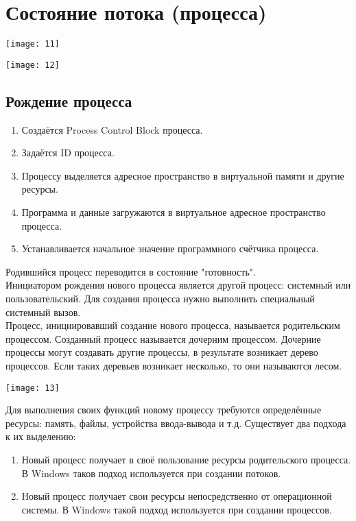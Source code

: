 \documentclass[a4paper]{article}
\begin{document}
\section{Состояние потока (процесса)}
\setcounter{subsection}{0}
\begin{center}
	\texttt{[image: 11]}
\end{center}
\begin{center}
	\texttt{[image: 12]}
\end{center}
\subsection{Рождение процесса}
\begin{enumerate}
        \item Создаётся Process Control Block процесса.
	\item Задаётся ID процесса.
	\item Процессу выделяется адресное пространство в виртуальной памяти и другие ресурсы.
	\item Программа и данные загружаются в виртуальное адресное пространство процесса.
	\item Устанавливается начальное значение программного счётчика процесса.
\end{enumerate}
Родившийся процесс переводится в состояние "готовность".\\
Инициатором рождения нового процесса является другой процесс: системный или пользовательский. Для создания процесса нужно выполнить специальный системный вызов.\\
Процесс, инициировавший создание нового процесса, называется родительским процессом. Созданный процесс называется дочерним процессом. Дочерние процессы могут создавать другие процессы, в результате возникает дерево процессов. Если таких деревьев возникает несколько, то они называются лесом.
\begin{center}
	\texttt{[image: 13]}
\end{center}
Для выполнения своих функций новому процессу требуются определённые ресурсы: память, файлы, устройства ввода-вывода и т.д. Существует два подхода к их выделению:
\begin{enumerate}
        \item Новый процесс получает в своё пользование ресурсы родительского процесса. В Windows таков подход используется при создании потоков.
	\item Новый процесс получает свои ресурсы непосредственно от операционной системы. В Windows такой подход используется при создании процессов.
\end{enumerate}
\end{document}
